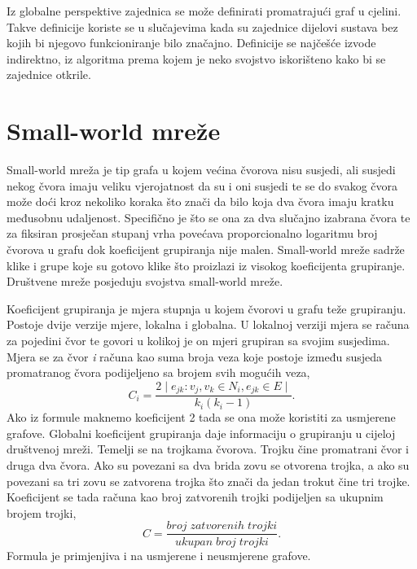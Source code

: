 Iz globalne perspektive zajednica se može definirati promatrajući graf u cjelini. Takve definicije koriste se u slučajevima kada su zajednice dijelovi sustava bez kojih bi njegovo funkcioniranje bilo značajno. Definicije se najčešće izvode indirektno, iz algoritma prema kojem je neko svojstvo iskorišteno kako bi se zajednice otkrile. 

\section{Small-world mreže}

Small-world mreža je tip grafa u kojem većina čvorova nisu susjedi, ali susjedi nekog čvora imaju veliku vjerojatnost da su i oni susjedi te se do svakog čvora može doći kroz nekoliko koraka što znači da bilo koja dva čvora imaju kratku međusobnu udaljenost. Specifično je što se ona za dva slučajno izabrana čvora te za fiksiran prosječan stupanj vrha povećava proporcionalno logaritmu broj čvorova u grafu dok koeficijent grupiranja nije malen. Small-world mreže sadrže klike i grupe koje su gotovo klike što proizlazi iz visokog koeficijenta grupiranje. Društvene mreže posjeduju svojstva small-world mreže.

Koeficijent grupiranja je mjera stupnja u kojem čvorovi u grafu teže grupiranju. Postoje dvije verzije mjere, lokalna i globalna. U lokalnoj verziji mjera se računa za pojedini čvor te govori u kolikoj je on mjeri grupiran sa svojim susjedima. Mjera se za čvor \textit{i} računa kao suma broja veza koje postoje između susjeda promatranog čvora podijeljeno sa brojem svih mogućih veza,
\begin{equation}
C_{i} = \dfrac{2 \mid e_{jk}:v_{j},v_{k} \in N_{i}, e_{jk} \in E \mid}{k_{i}(k_{i}-1)}.
\end{equation}
 Ako iz formule maknemo koeficijent 2 tada se ona može koristiti za usmjerene grafove.
Globalni koeficijent grupiranja daje informaciju o grupiranju u cijeloj društvenoj mreži. Temelji se na trojkama čvorova. Trojku čine promatrani čvor i druga dva čvora. Ako su povezani sa dva brida zovu se otvorena trojka, a ako su povezani sa tri zovu se zatvorena trojka što znači da jedan trokut čine tri trojke. Koeficijent se tada računa kao broj zatvorenih trojki podijeljen sa ukupnim brojem trojki, 
\begin{equation}
 C = \dfrac{broj \; zatvorenih \; trojki}{ukupan \; broj \; trojki}.
\end{equation}
Formula je primjenjiva i na usmjerene i neusmjerene grafove.

